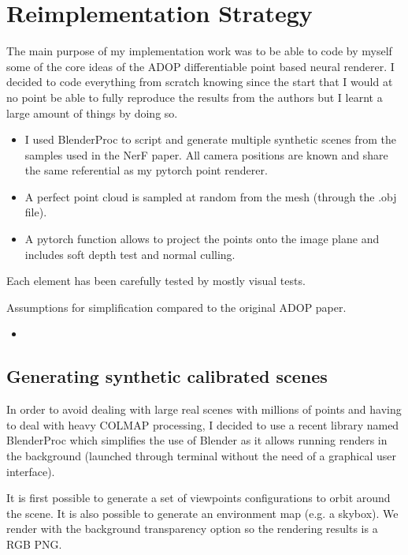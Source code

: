 \section{Reimplementation Strategy}
\label{sec:remplementation}

The main purpose of my implementation work was to be able to code by myself some of the core ideas of the ADOP differentiable point based neural renderer.
I decided to code everything from scratch knowing since the start that I would at no point be able to fully reproduce the results from the authors but I learnt a large amount of things by doing so.
\begin{itemize}
    \item I used BlenderProc \cite{Denninger2023} to script and generate multiple synthetic scenes from the samples used in the NerF paper. All camera positions are known and share the same referential as my pytorch point renderer.
    \item A perfect point cloud is sampled at random from the mesh (through the .obj file).
    \item A pytorch function allows to project the points onto the image plane and includes soft depth test and normal culling.
\end{itemize}

Each element has been carefully tested by mostly visual tests.


Assumptions for simplification compared to the original ADOP paper. 
\begin{itemize}
    \item 
\end{itemize}



\subsection{Generating synthetic calibrated scenes}
\label{sec:synthetic_calibrated_scenes}
In order to avoid dealing with large real scenes with millions of points and having to deal with heavy COLMAP processing, I decided to use a recent library named BlenderProc  \cite{Denninger2023} which simplifies the use of Blender as it allows running renders in the background (launched through terminal without the need of a graphical user interface).

It is first possible to generate a set of viewpoints configurations to orbit around the scene. It is also possible to generate an environment map (e.g. a skybox). We render with the background transparency option so the rendering results is a RGB PNG. 

